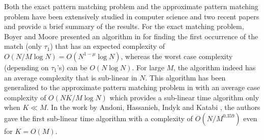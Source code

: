 Both the exact pattern matching problem and the approximate pattern matching problem have been extensively studied in computer science and two recent papers \cite{andoni2013shift} and \cite{amir2004faster} provide a brief summary of the results. For the exact matching problem, Boyer and Moore presented an algorithm in \cite{boyer1977fast} for finding the first occurrence of the match (only $\tau_1$) that has an expected complexity of $O(N/M \log N) = O(N^{1-\mu} \log N)$, whereas the worst case complexity (depending on $\tau_1$'s) can be $O(N \log N)$. For large $M$, the algorithm indeed has an average complexity that is sub-linear in $N$. This algorithm has been generalized to the approximate pattern matching problem in \cite{chang1994approximate} with an average case complexity of $O(NK/M \log N)$ which provides a sub-linear time algorithm only when $K \ll M$. In the work by Andoni, Hassanieh, Indyk and Katabi \cite{andoni2013shift}, the authors gave the first sub-linear time algorithm with a complexity of $O(N/M^{0.359})$ even for $K = O(M)$.

